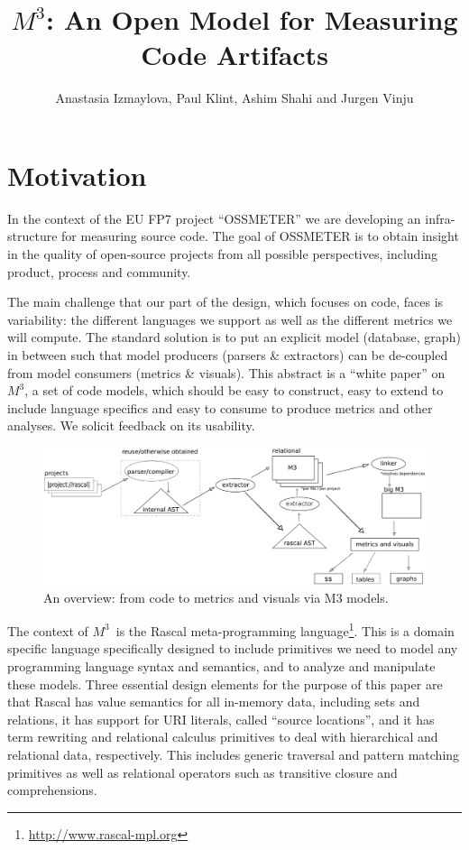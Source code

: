\documentclass[a4]{IEEEtran}
\title{$M^3$: An Open Model for Measuring Code Artifacts}
\author{ Anastasia Izmaylova, Paul Klint, Ashim Shahi and Jurgen Vinju}
\date{}
\newcommand{\mthree}{\ensuremath{M^3}}
\begin{document}
\maketitle

\section{Motivation}

In the context of the EU FP7 project ``OSSMETER'' we are developing an infra-structure for measuring source code. The goal of OSSMETER is to obtain insight in the quality of open-source projects from all possible perspectives, including product, process and community. 

The main challenge that our part of the design, which focuses on code, faces is variability: the different languages we support as well as the different metrics we will compute. The standard solution is to put an explicit model (database, graph) in between such that model producers (parsers \& extractors) can be de-coupled from model consumers (metrics \& visuals). This abstract is a ``white paper'' on \mthree, a set of code models, which should be easy to construct, easy to extend to include language specifics and easy to consume to produce metrics and other analyses. We solicit feedback on its usability.

\begin{figure}[t]
\includegraphics[width=\columnwidth]{m3}
\caption{An overview: from code to metrics and visuals via M3 models.}
\end{figure}

The context of \mthree\ is the Rascal meta-programming language\footnote{\url{http://www.rascal-mpl.org}}. This is a domain specific language specifically designed to include primitives we need to model any programming language syntax and semantics, and to analyze and manipulate these models. Three essential design elements for the purpose of this paper are that Rascal has value semantics for all in-memory data, including sets and relations, it has support for URI literals, called ``source locations'', and it has term rewriting and relational calculus primitives to deal with hierarchical and relational data, respectively. This includes generic traversal and pattern matching primitives as well as relational operators such as transitive closure and comprehensions. 
\end{document}
